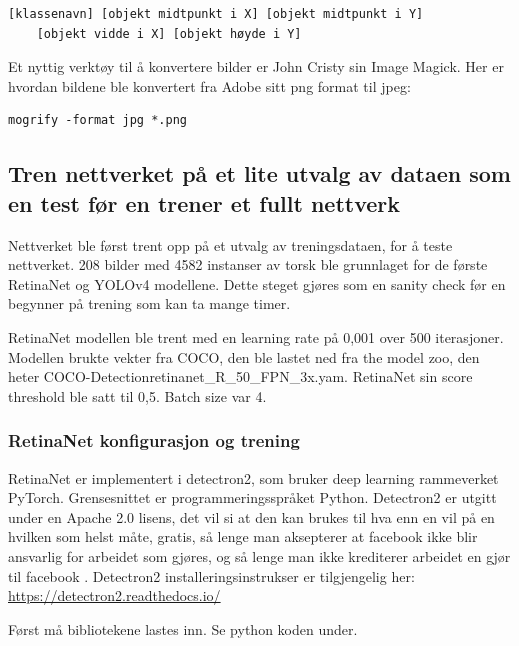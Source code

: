 \begin{verbatim}
[klassenavn] [objekt midtpunkt i X] [objekt midtpunkt i Y]
	[objekt vidde i X] [objekt høyde i Y]
\end{verbatim}

Et nyttig verktøy til å konvertere bilder er John Cristy sin Image Magick. Her er hvordan bildene ble konvertert fra Adobe sitt png format til jpeg:

\begin{verbatim}
mogrify -format jpg *.png
\end{verbatim}

\subsection{Tren nettverket på et lite utvalg av dataen som en test før en trener et fullt nettverk}

Nettverket ble først trent opp på et utvalg av treningsdataen, for å teste nettverket. 208 bilder med 4582 instanser av torsk ble grunnlaget for de første RetinaNet og YOLOv4 modellene. Dette steget gjøres som en sanity check før en begynner på trening som kan ta mange timer.

RetinaNet modellen ble trent med en learning rate på 0,001 over 500 iterasjoner. Modellen brukte vekter fra COCO, den ble lastet ned fra the model zoo, den heter COCO-Detection\/retinanet\_R\_50\_FPN\_3x.yam. RetinaNet sin score threshold ble satt til 0,5. Batch size var 4.

\subsubsection{RetinaNet konfigurasjon og trening}

RetinaNet er implementert i detectron2, som bruker deep learning rammeverket PyTorch. Grensesnittet er programmeringsspråket Python. Detectron2 er utgitt under en Apache 2.0 lisens, det vil si at den kan brukes til hva enn en vil på en hvilken som helst måte, gratis, så lenge man aksepterer at facebook ikke blir ansvarlig for arbeidet som gjøres, og så lenge man ikke krediterer arbeidet en gjør til facebook \cite{The Apache Software Foundation 2004}. Detectron2 installeringsinstrukser er tilgjengelig her: \url{https://detectron2.readthedocs.io/}

Først må bibliotekene lastes inn. Se python koden under.

